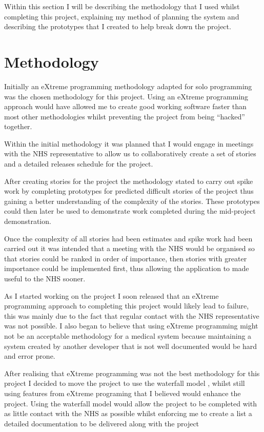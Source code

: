 Within this section I will be describing the methodology that I used whilst completing this project, explaining my method of planning the system and describing the prototypes that I created to help break down the project.

\section{Methodology}

Initially an eXtreme programming \cite{xp} methodology adapted for solo programming was the chosen methodology for this project. Using an eXtreme programming approach would have allowed me to create good working software faster than most other methodologies whilst preventing the project from being “hacked” together.

Within the initial methodology it was planned that I would engage in meetings with the NHS representative to allow us to collaboratively create a set of stories and a detailed releases schedule for the project. 

After creating stories for the project the methodology stated to carry out spike work by completing prototypes for predicted difficult stories of the project thus gaining a better understanding of the complexity of the stories. These prototypes could then later be used to demonstrate work completed during the mid-project demonstration.

Once the complexity of all stories had been estimates and spike work had been carried out it was intended that a meeting with the NHS would be organised so that stories could be ranked in order of importance, then stories with greater importance could be implemented first, thus allowing the application to made useful to the NHS sooner.

As I started working on the project I soon released that an eXtreme programming approach to completing this project would likely lead to failure, this was mainly due to the fact that regular contact with the NHS representative was not possible.  I also began to believe that using eXtreme programming \cite{xp} might not be an acceptable methodology for a medical system because maintaining a system created by another developer that is not well documented would be hard and error prone.

After realising that eXtreme programming \cite{xp} was not the best methodology for this project I decided to move the project to use the waterfall model \cite{waterfall}, whilst still using features from eXtreme programing \cite{xp} that I believed would enhance the project. Using the waterfall model \cite{waterfall} would allow the project to be completed with as little contact with the NHS as possible whilst enforcing me to create a list a detailed documentation to be delivered along with the project

